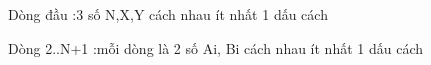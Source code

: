 Dòng đầu :3 số N,X,Y cách nhau ít nhất 1 dấu cách  

   Dòng 2..N+1 :mỗi dòng là 2 số Ai, Bi cách nhau ít nhất 1 dấu cách  

\